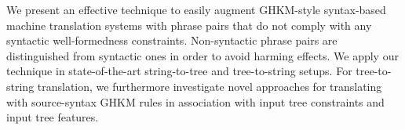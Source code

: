 We present an effective technique to easily augment GHKM-style syntax-based machine translation systems with phrase pairs that do not comply with any syntactic well-formedness constraints. Non-syntactic phrase pairs are distinguished from syntactic ones in order to avoid harming effects. We apply our technique in state-of-the-art string-to-tree and tree-to-string setups. For tree-to-string translation, we furthermore investigate novel approaches for translating with source-syntax GHKM rules in association with input tree constraints and input tree features.
